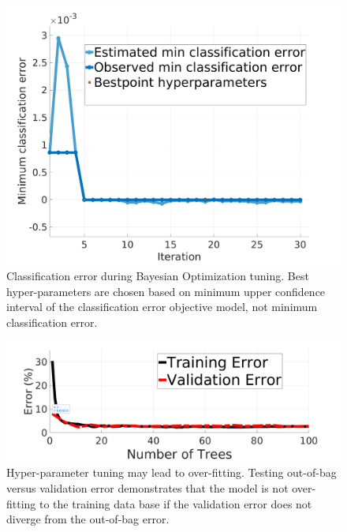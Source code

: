 \documentclass[journal,onecolumn]{IEEEtran}
\begin{document}
			\begin{figure}[H]
				\centering
				\includegraphics[width=0.75\linewidth]{figures/c2_min_class_error_2}
				\caption[RDF Training Classification Error]{Classification error during Bayesian Optimization tuning. Best hyper-parameters are chosen based on minimum upper confidence interval of the classification error objective model, not minimum classification error.}
				\label{fig:c2_min_class_error}
			\end{figure}
		
			\begin{figure}[H]
				\centering
				\includegraphics[width=0.75\linewidth]{figures/train_vs_valid_overfit_test_2}
				\caption[Training vs Validation Error]{Hyper-parameter tuning may lead to over-fitting. Testing out-of-bag versus validation error demonstrates that the model is not over-fitting to the training data base if the validation error does not diverge from the out-of-bag error.}
				\label{fig:train_vs_valid_overfit_test2}
			\end{figure}
		
		
\end{document}
